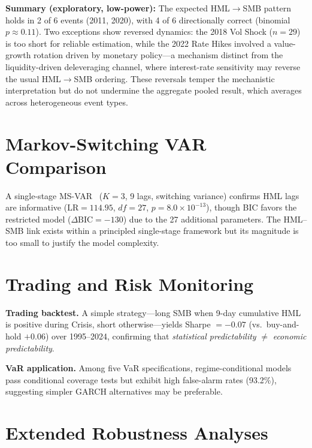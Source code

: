 \documentclass[sigconf,anonymous]{acmart}
\begin{document}
\textbf{Summary (exploratory, low-power):} The expected HML$\to$SMB pattern
holds in 2 of 6 events (2011, 2020), with 4 of 6 directionally correct
(binomial $p \approx 0.11$). Two exceptions show reversed dynamics:
the 2018 Vol Shock ($n = 29$) is too short for reliable estimation, while the
2022 Rate Hikes involved a value-growth rotation driven by monetary policy---a
mechanism distinct from the liquidity-driven deleveraging channel, where
interest-rate sensitivity may reverse the usual HML$\to$SMB ordering.
These reversals temper the mechanistic interpretation but do not undermine
the aggregate pooled result, which averages across heterogeneous event types.

\section{Markov-Switching VAR Comparison}
\label{app:msvar}

A single-stage MS-VAR~\cite{krolzig1997markov} ($K = 3$, 9 lags, switching variance)
confirms HML lags are informative ($\text{LR} = 114.95$, $df = 27$, $p = 8.0 \times 10^{-13}$),
though BIC favors the restricted model ($\Delta\text{BIC} = -130$) due to the 27 additional
parameters. The HML--SMB link exists within a principled single-stage framework
but its magnitude is too small to justify the model complexity.

\section{Trading and Risk Monitoring}
\label{app:trading}
\label{app:var}
\label{alg:monitor}\label{tab:algo_params}\label{tab:hybrid_sensitivity}\label{tab:var_hybrid}\label{fig:hybrid_detector}

\textbf{Trading backtest.}
A simple strategy---long SMB when 9-day cumulative HML is positive during
Crisis, short otherwise---yields Sharpe $= -0.07$ (vs.\ buy-and-hold
$+0.06$) over 1995--2024, confirming that \emph{statistical predictability}
$\neq$ \emph{economic predictability}.

\textbf{VaR application.}
Among five VaR specifications, regime-conditional models pass conditional coverage tests but exhibit high false-alarm rates (93.2\%), suggesting simpler GARCH alternatives may be preferable.

\section{Extended Robustness Analyses}
\label{app:robustness}
\end{document}
